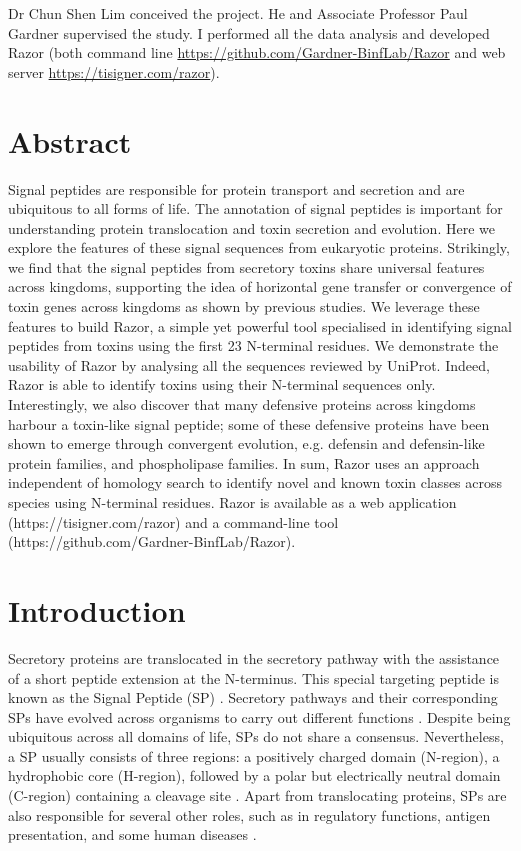 Dr Chun Shen Lim conceived the project. He and Associate Professor Paul Gardner supervised the study. I performed all the data analysis and developed Razor (both command line \href{https://github.com/Gardner-BinfLab/Razor}{https://github.com/Gardner-BinfLab/Razor} and web server \href{https://tisigner.com/razor}{https://tisigner.com/razor}).

\section{Abstract}
Signal peptides are responsible for protein transport and secretion and are ubiquitous to all forms of life. The annotation of signal peptides is important for understanding protein translocation and toxin secretion and evolution. Here we explore the features of these signal sequences from eukaryotic proteins. Strikingly, we find that the signal peptides from secretory toxins share universal features across kingdoms, supporting the idea of horizontal gene transfer or convergence of toxin genes across kingdoms as shown by previous studies. We leverage these features to build Razor, a simple yet powerful tool specialised in identifying signal peptides from toxins using the first 23 N-terminal residues. We demonstrate the usability of Razor by analysing all the sequences reviewed by UniProt. Indeed, Razor is able to identify toxins using their N-terminal sequences only. Interestingly, we also discover that many defensive proteins across kingdoms harbour a toxin-like signal peptide; some of these defensive proteins have been shown to emerge through convergent evolution, e.g. defensin and defensin-like protein families, and phospholipase families. In sum, Razor uses an approach independent of homology search to identify novel and known toxin classes across species using N-terminal residues. Razor is available as a web application (https://tisigner.com/razor) and a command-line tool (https://github.com/Gardner-BinfLab/Razor).



\section{Introduction}
Secretory proteins are translocated in the secretory pathway with the assistance of a short peptide extension at the N-terminus. This special targeting peptide is known as the Signal Peptide (SP) \cite{Von_Heijne1990-sb}. Secretory pathways and their corresponding SPs have evolved across organisms to carry out different functions \cite{Hegde2006-od,Owji2018-hg}. Despite being ubiquitous across all domains of life, SPs do not share a consensus. Nevertheless, a SP usually consists of three regions: a positively charged domain (N-region), a hydrophobic core (H-region), followed by a polar but electrically neutral domain (C-region) containing a cleavage site \cite{Von_Heijne1985-qv,Von_Heijne1990-sb,Nielsen1998-dy}. Apart from translocating proteins, SPs are also responsible for several other roles, such as in regulatory functions, antigen presentation, and some human diseases \cite{Borrego1998-la,Datta2007-av,Owji2018-hg}.

